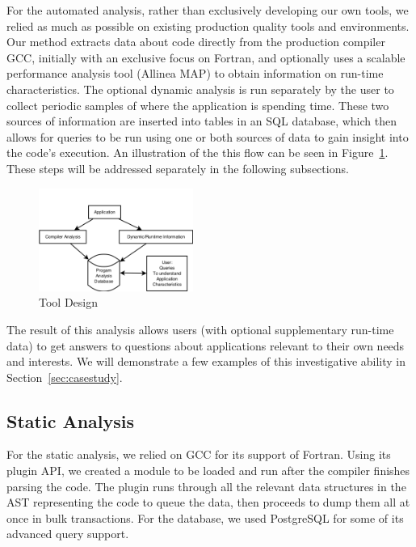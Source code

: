 For the automated analysis, rather than exclusively developing our own tools, we relied as much as 
possible on existing production quality tools and environments.
Our method extracts data about code directly from the production compiler \acs{GCC}, initially with 
an exclusive focus on Fortran, and optionally uses a scalable performance analysis tool (Allinea 
MAP) to obtain information on run-time characteristics.
The optional dynamic analysis is run separately by the user to collect periodic samples of where the 
application is spending time.
These two sources of information are inserted into tables in an \acs{SQL} database, which then 
allows 
for queries to be run using one or both sources of data to gain insight into the code's execution.
An illustration of the this flow can be seen in Figure~\ref{fig:design}.
These steps will be addressed separately in the following subsections.

\begin{figure}
\begin{center}
\includegraphics[width=0.45\textwidth]{images/design.png}
\end{center}
\caption{Tool Design}
\label{fig:design}
\end{figure}

The result of this analysis allows users (with optional supplementary run-time data) to get answers to 
questions about applications relevant to their own needs and interests.
We will demonstrate a few examples of this investigative ability in Section~\ref{sec:casestudy}.

\subsection{Static Analysis}
For the static analysis, we relied on \acs{GCC} for its support of Fortran.
Using its plugin \acs{API}, we created a module to be loaded and run after the compiler finishes 
parsing the code.
The plugin runs through all the relevant data structures in the \ac{AST} representing the code to 
queue the data, then proceeds to dump them all at once in bulk transactions.
For the database, we used PostgreSQL for some of its advanced query support.
